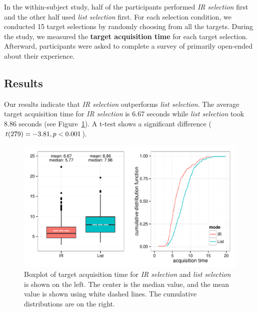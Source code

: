 In the within-subject study, half of the participants performed {\em IR selection} first and the other half used {\em list selection} first. For each selection condition, we conducted 15 target selections by randomly choosing from all the targets. During the study, we measured the {\bf target acquisition time} for each target selection. Afterward, participants were asked to complete a survey of primarily open-ended  about their experience.



\subsection{Results}


Our results indicate that {\em IR selection} outperforms {\em list selection}.  The average target acquisition time for {\em IR selection} is 6.67 seconds 
while {\em list selection} took 8.86 seconds (see Figure~\ref{fig:ir_vs_list}). A t-test shows a significant difference ($t(279)=-3.81, {p < 0.001}$).


\begin{figure}[t]
\centering
\includegraphics[width=0.95\columnwidth]{figures/result_study1a.pdf}
\caption{Boxplot of target acquisition time for {\em IR selection} and {\em list selection} is shown on the left. The center is the median value, and the mean value is shown using white dashed lines. The cumulative distributions are on the right.}
\label{fig:ir_vs_list}
\end{figure}

